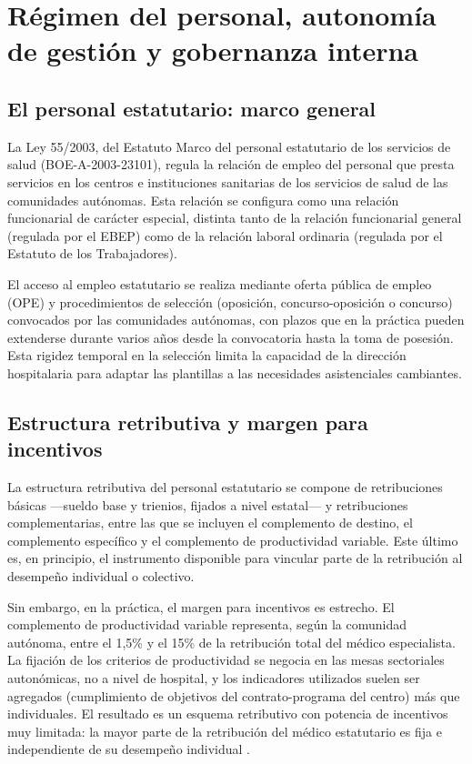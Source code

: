 \section{Régimen del personal, autonomía de gestión y gobernanza interna}
\label{sec:personal}

\subsection{El personal estatutario: marco general}

La Ley 55/2003, del Estatuto Marco del personal estatutario de los servicios de salud (BOE-A-2003-23101), regula la relación de empleo del personal que presta servicios en los centros e instituciones sanitarias de los servicios de salud de las comunidades autónomas. Esta relación se configura como una relación funcionarial de carácter especial, distinta tanto de la relación funcionarial general (regulada por el EBEP) como de la relación laboral ordinaria (regulada por el Estatuto de los Trabajadores).

El acceso al empleo estatutario se realiza mediante oferta pública de empleo (OPE) y procedimientos de selección (oposición, concurso-oposición o concurso) convocados por las comunidades autónomas, con plazos que en la práctica pueden extenderse durante varios años desde la convocatoria hasta la toma de posesión. Esta rigidez temporal en la selección limita la capacidad de la dirección hospitalaria para adaptar las plantillas a las necesidades asistenciales cambiantes.

\subsection{Estructura retributiva y margen para incentivos}

La estructura retributiva del personal estatutario se compone de retribuciones básicas ---sueldo base y trienios, fijados a nivel estatal--- y retribuciones complementarias, entre las que se incluyen el complemento de destino, el complemento específico y el complemento de productividad variable. Este último es, en principio, el instrumento disponible para vincular parte de la retribución al desempeño individual o colectivo.

Sin embargo, en la práctica, el margen para incentivos es estrecho. El complemento de productividad variable representa, según la comunidad autónoma, entre el 1,5\% y el 15\% de la retribución total del médico especialista. La fijación de los criterios de productividad se negocia en las mesas sectoriales autonómicas, no a nivel de hospital, y los indicadores utilizados suelen ser agregados (cumplimiento de objetivos del contrato-programa del centro) más que individuales. El resultado es un esquema retributivo con potencia de incentivos muy limitada: la mayor parte de la retribución del médico estatutario es fija e independiente de su desempeño individual \citep{monereo2007}.

